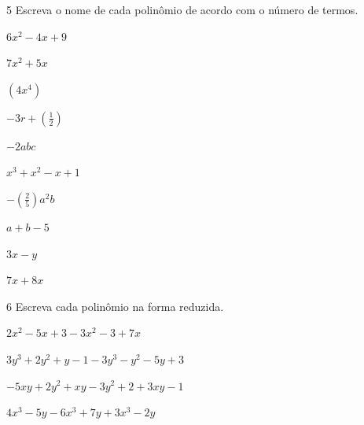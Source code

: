 \pagebreak
\num{5} Escreva o nome de cada polinômio de acordo com o número de termos.

\begin{escolha}[itemsep=0pt]
\item $6x^2 - 4x +9$  \\

\item $7x^2 + 5 x$  \\

\item $(4x^4)$  \\

\item $-3r + (\frac{1}{2})$  \\

\item $-2abc$  \\

\item $x^3 + x^2 - x + 1$  \\

\item $-(\frac{2}{5}) a^2b$  \\

\item $a + b - 5$  \\

\item $3x - y$  \\

\item $7x + 8x$  \\

\end{escolha}


\num{6} Escreva cada polinômio na forma reduzida.

\begin{escolha}[itemsep=0pt]
\item $2x^2 - 5x + 3 - 3x^2 - 3 + 7x$\\

\item $3y^3 + 2y^2 + y - 1 - 3y^3 - y^2 - 5y +3$\\

\item $-5xy + 2y^2 + xy - 3y^2 + 2 + 3xy - 1$\\

\item $4x^3 - 5y - 6x^3 + 7y + 3x^3 - 2y$\\

\end{escolha}


